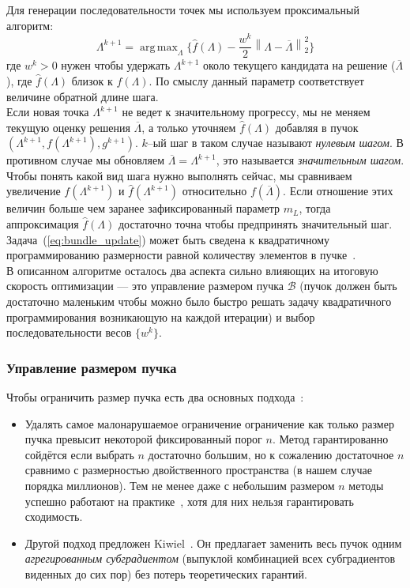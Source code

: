 \documentclass{article}
\DeclareMathOperator*{\argmax}{arg\,max}
\begin{document}
Для генерации последовательности точек мы используем проксимальный алгоритм:\\
\begin{equation}
\Lambda^{k + 1} = \argmax_{\Lambda} \{\hat{f}(\Lambda)  - \frac{w^k}{2} \left \| \Lambda - \overline{\Lambda} \right \|_2^2\}
\label{eq:bundle_update}
\end{equation}
где $w^k > 0$ нужен чтобы удержать $\Lambda^{k + 1}$ около текущего кандидата на решение ($\overline{\Lambda}$), где $\hat{f}(\Lambda)$ близок к $f(\Lambda)$. По смыслу данный параметр соответствует величине обратной длине шага.\\
Если новая точка $\Lambda^{k + 1}$ не ведет к значительному прогрессу, мы не меняем текущую оценку решения $\overline{\Lambda}$, а только уточняем $\hat{f}(\Lambda)$ добавляя в пучок $(\Lambda^{k+1}, f(\Lambda^{k+1}), g^{k+1})$. $k$--ый шаг в таком случае называют \textit{нулевым шагом}. В противном случае мы обновляем $\overline{\Lambda} = \Lambda^{k + 1}$, это называется \textit{значительным шагом}. Чтобы понять какой вид шага нужно выполнять сейчас, мы сравниваем увеличение $f(\Lambda^{k+1})$ и $\hat{f}(\Lambda^{k+1})$ относительно $f(\overline{\Lambda})$. Если отношение этих величин больше чем заранее зафиксированный параметр $m_L$, тогда аппроксимация $\hat{f}(\Lambda)$ достаточно точна чтобы предпринять значительный шаг.\\

Задача~(\ref{eq:bundle_update}) может быть сведена к квадратичному программированию размерности равной количеству элементов в пучке~\cite{Bundle}.\\

В описанном алгоритме осталось два аспекта сильно влияющих на итоговую скорость оптимизации --- это управление размером пучка $\mathcal{B}$ (пучок должен быть достаточно маленьким чтобы можно было быстро решать задачу квадратичного программирования возникающую на каждой итерации) и выбор последовательности весов $\{w^k\}$.

\subsubsection{Управление размером пучка}
Чтобы ограничить размер пучка есть два основных подхода~\cite{Bundle}:\\
\begin{itemize}
\item Удалять самое малонарушаемое ограничение ограничение как только размер пучка превысит некоторой фиксированный порог $n$. Метод гарантированно сойдётся если выбрать $n$ достаточно большим, но к сожалению достаточное $n$ сравнимо с размерностью двойственного пространства (в нашем случае порядка миллионов). Тем не менее даже с небольшим размером $n$ методы успешно работают на практике~\cite{Bundle}, хотя для них нельзя гарантировать сходимость.\\
\item Другой подход предложен Kiwiel~\cite{ABundle}. Он предлагает заменить весь пучок одним \emph{агрегированным субградиентом} (выпуклой комбинацией всех субградиентов виденных до сих пор) без потерь теоретических гарантий.
\end{itemize}
\end{document}
